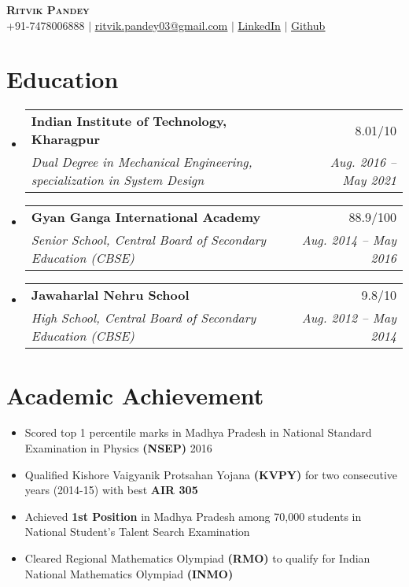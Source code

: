 \documentclass[letterpaper,11pt]{article}
\makeatletter
\newcommand{\resumeItem}[1]{
  \item\small{
    {#1 \vspace{-2pt}}
  }
}
\newcommand{\resumeSubheading}[4]{
  \vspace{-2pt}\item
    \begin{tabular*}{0.97\textwidth}[t]{l@{\extracolsep{\fill}}r}
      \textbf{#1} & #2 \\
      \textit{\small#3} & \textit{\small #4} \\
    \end{tabular*}\vspace{-7pt}
}
\newcommand{\resumeProjectHeading}[2]{
    \item
    \begin{tabular*}{0.97\textwidth}{l@{\extracolsep{\fill}}r}
      \small#1 & #2 \\
    \end{tabular*}\vspace{-7pt}
}
\newcommand{\resumeSubHeadingListStart}{\begin{itemize}[leftmargin=0.15in, label={}]}
\newcommand{\resumeSubHeadingListEnd}{\end{itemize}}
\newcommand{\resumeItemListStart}{\begin{itemize}}
\newcommand{\resumeItemListEnd}{\end{itemize}\vspace{-5pt}}
\makeatother
\begin{document}

\begin{center}
    \textbf{\Huge \scshape Ritvik Pandey} \\ \vspace{1pt}
    \small +91-7478006888 $|$ \href{mailto:ritvik.pandey03@gmail.com}{\underline{ritvik.pandey03@gmail.com}} $|$ 
    \href{https://www.linkedin.com/in/ritvik-pandey-03/}{\underline{LinkedIn}} $|$
    \href{https://github.com/ritvik03}{\underline{Github}}
\end{center}


\section{Education}
  \resumeSubHeadingListStart
    \resumeSubheading
      {Indian Institute of Technology, Kharagpur}{8.01/10}
      {Dual Degree in Mechanical Engineering, specialization in System Design}{Aug. 2016 -- May 2021}
    \resumeSubheading
      {Gyan Ganga International Academy}{88.9/100}
      {Senior School, Central Board of Secondary Education (CBSE)}{Aug. 2014 -- May 2016}
    \resumeSubheading
      {Jawaharlal Nehru School}{9.8/10}
      {High School, Central Board of Secondary Education (CBSE)}{Aug. 2012 -- May 2014}
  \resumeSubHeadingListEnd



\section{Academic Achievement}
          \resumeItemListStart
            \resumeItem{Scored top 1 percentile marks in Madhya Pradesh in National Standard Examination in Physics \textbf{(NSEP)} 2016}
            \resumeItem{Qualified Kishore Vaigyanik Protsahan Yojana \textbf{(KVPY)} for two consecutive years (2014-15) with best \textbf{AIR 305}}
            \resumeItem{Achieved \textbf{1st Position} in Madhya Pradesh among 70,000 students in National Student's Talent Search Examination}
            \resumeItem{Cleared Regional Mathematics Olympiad \textbf{(RMO)} to qualify for Indian National Mathematics Olympiad \textbf{(INMO)}}
          \resumeItemListEnd
\end{document}
